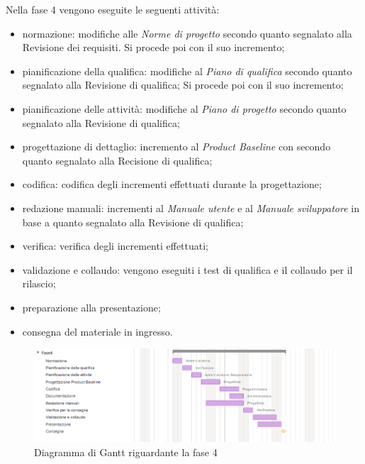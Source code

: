 Nella fase 4 vengono eseguite le seguenti attività:
\begin{itemize}
	\item normazione: modifiche alle \textit{Norme di progetto} secondo quanto segnalato alla Revisione dei requisiti. Si procede poi con il suo incremento;
	\item pianificazione della qualifica: modifiche al \textit{Piano di qualifica} secondo quanto segnalato alla Revisione di qualifica; Si procede poi con il suo incremento;
	\item pianificazione delle attività: modifiche al \textit{Piano di progetto} secondo quanto segnalato alla Revisione di qualifica;
	\item progettazione di dettaglio: incremento al \textit{Product Baseline} con secondo quanto segnalato alla Recisione di qualifica;
	\item codifica: codifica degli incrementi effettuati durante la progettazione;
	\item redazione manuali: incrementi al \textit{Manuale utente} e al \textit{Manuale sviluppatore} in base a quanto segnalato alla Revisione di qualifica;
	\item verifica: verifica degli incrementi effettuati;
	\item validazione e collaudo: vengono eseguiti i test di qualifica e il collaudo per il rilascio;
	\item preparazione alla presentazione;
	\item consegna del materiale in ingresso.
\end{itemize}

\begin{figure}[h]
	\centering
	\includegraphics[scale=0.70]{images/fase4.png}
	\caption{Diagramma di Gantt riguardante la fase 4}
\end{figure}